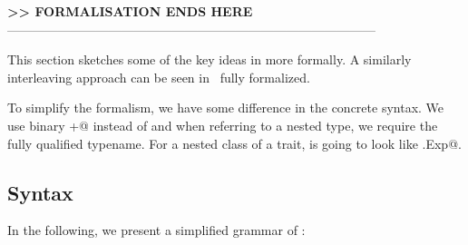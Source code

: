 \textbf {>> FORMALISATION ENDS HERE} \\
---------------------------------------------------------------------------------------



This section sketches some of the key ideas in \name more
formally. A similarly interleaving approach can be seen in~\cite{servetto2014meta} fully formalized.

To simplify the formalism, 
 we have some difference in the concrete syntax.
We use binary \Q@+@ instead of \use
and when referring to a nested type, we require the fully
qualified typename. For a nested class of a trait,
is going to look like \Q@This.Exp@.


\subsection{Syntax}

In the following, we present a simplified grammar of \name:

\begin{bnf}
\prodFull{}\\
\prodFull{}\\
\prodFull{}\\
\prodFull{}\\
\prodFull{}\\
\prodFull{}\\

\prodFull{}\\
\prodFull{}\\
\end{bnf}

